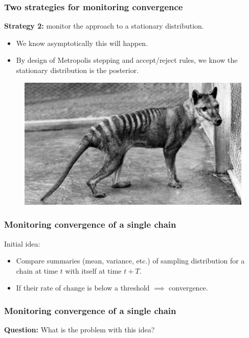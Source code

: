 \documentclass[handout]{beamer}
\begin{document}
\begin{frame}
\frametitle{Two strategies for monitoring convergence}

\textbf{Strategy 2:} monitor the approach to a stationary distribution.

\begin{itemize}
\item<3-> We know asymptotically this will happen.
\item<4-> By design of Metropolis stepping and accept/reject rules, we know the stationary distribution is the posterior.
\end{itemize}

\begin{figure}[ht]
\centerline{\includegraphics[width=1\textwidth]{animations_figures/thylacine.jpg}}
\end{figure}

\end{frame}

\begin{frame}
\frametitle{Monitoring convergence of a single chain}

Initial idea:
\begin{itemize}
\item<2-> Compare summaries (mean, variance, etc.) of sampling distribution for a chain at time $t$ with itself at time $t+T$.
\item<3-> If their rate of change is below a threshold $\implies$ convergence.
\end{itemize}

\end{frame}

\begin{frame}
\frametitle{Monitoring convergence of a single chain}
\Large \textbf{Question:} What is the problem with this idea?
\end{frame}
\end{document}
